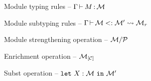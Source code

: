 \begin{figure}[tbp]
  \vspace{-3mm}
  \caption{Module typing rules -- $\Gamma \operatorname{\vdash}_{} M \operatorname{:} \mathcal M$}
  \label{module:typing}
\end{figure}

\begin{figure}[tbp]
  \vspace{-3mm}
  \caption{Module subtyping rules -- $\Gamma \operatorname{\vdash} \mathcal M <: \mathcal M' \leadsto \mathcal M_r$}
  \label{module:subtyping}
\end{figure}

\begin{figure}[tbp]
  
  \caption{Module strengthening operation -- $\mathcal M/\mathcal P$}
  \label{module:strengthen}
\end{figure}

\begin{figure}[tbp]
  
  \caption{Enrichment operation -- ${\mathcal M}_{\left[\mathcal C\right]}$}
  \label{module:enrich}
\end{figure}

\begin{figure}[tbp]
  
  \caption{Subst operation -- $\mathtt{let}\ X : \mathcal M\ \mathtt{in}\ \mathcal M'$}
  \label{module:subst}
\end{figure}

